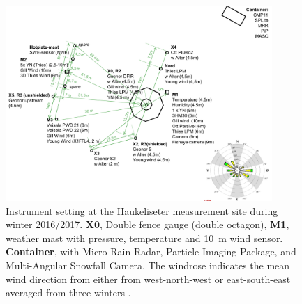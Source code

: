 \begin{figure}[t!]
	\centering
	\includegraphics[width=0.9\textwidth]{./fig_instruments/instrument_setting.png}
	\caption{Instrument setting at the Haukeliseter measurement site during winter 2016/2017. \textbf{X0}, Double fence gauge (double octagon), \textbf{M1}, weather mast with pressure, temperature and \SI{10}{\metre} wind sensor. \textbf{Container}, with Micro Rain Radar, Particle Imaging Package, and Multi-Angular Snowfall Camera. The windrose indicates the mean wind direction from either from west-north-west or east-south-east averaged from three winters \citep[adapdet from][]{wolff_derivation_2015}. }\label{fig:inst_setting}
\end{figure}


